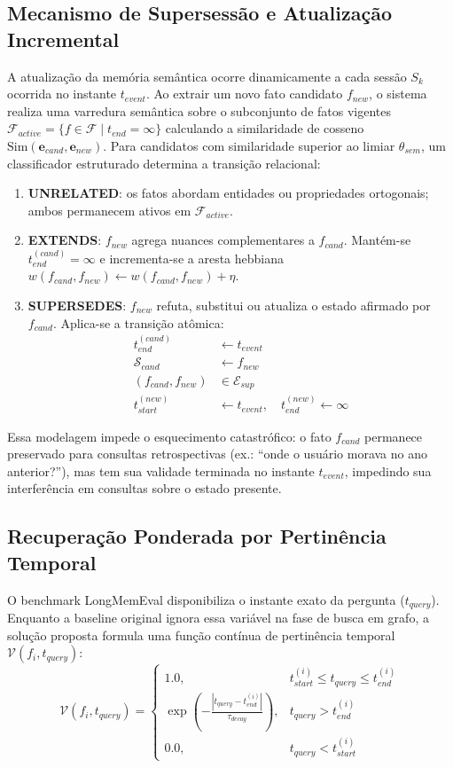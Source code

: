 \documentclass[10pt,conference,twocolumn]{IEEEtran}
\begin{document}
\subsection{Mecanismo de Supersessão e Atualização Incremental}
A atualização da memória semântica ocorre dinamicamente a cada sessão $S_k$ ocorrida no instante $t_{event}$. Ao extrair um novo fato candidato $f_{new}$, o sistema realiza uma varredura semântica sobre o subconjunto de fatos vigentes $\mathcal{F}_{active} = \{f \in \mathcal{F} \mid t_{end} = \infty\}$ calculando a similaridade de cosseno $\text{Sim}(\mathbf{e}_{cand}, \mathbf{e}_{new})$. Para candidatos com similaridade superior ao limiar $\theta_{sem}$, um classificador estruturado determina a transição relacional:
\begin{enumerate}
    \item \textbf{UNRELATED}: os fatos abordam entidades ou propriedades ortogonais; ambos permanecem ativos em $\mathcal{F}_{active}$.
    \item \textbf{EXTENDS}: $f_{new}$ agrega nuances complementares a $f_{cand}$. Mantém-se $t_{end}^{(cand)} = \infty$ e incrementa-se a aresta hebbiana $w(f_{cand}, f_{new}) \leftarrow w(f_{cand}, f_{new}) + \eta$.
    \item \textbf{SUPERSEDES}: $f_{new}$ refuta, substitui ou atualiza o estado afirmado por $f_{cand}$. Aplica-se a transição atômica:
    \begin{align}
        t_{end}^{(cand)} &\leftarrow t_{event} \\
        \mathcal{S}_{cand} &\leftarrow f_{new} \\
        (f_{cand}, f_{new}) &\in \mathcal{E}_{sup} \\
        t_{start}^{(new)} &\leftarrow t_{event}, \quad t_{end}^{(new)} \leftarrow \infty
    \end{align}
\end{enumerate}

Essa modelagem impede o esquecimento catastrófico: o fato $f_{cand}$ permanece preservado para consultas retrospectivas (ex.: ``onde o usuário morava no ano anterior?''), mas tem sua validade terminada no instante $t_{event}$, impedindo sua interferência em consultas sobre o estado presente.

\subsection{Recuperação Ponderada por Pertinência Temporal}
O benchmark LongMemEval disponibiliza o instante exato da pergunta ($t_{query}$). Enquanto a baseline original ignora essa variável na fase de busca em grafo, a solução proposta formula uma função contínua de pertinência temporal $\mathcal{V}(f_i, t_{query})$:
\begin{equation}
\mathcal{V}(f_i, t_{query}) = 
\begin{cases}
1.0, & t_{start}^{(i)} \le t_{query} \le t_{end}^{(i)} \\
\exp\!\left(-\frac{|t_{query} - t_{end}^{(i)}|}{\tau_{decay}}\right), & t_{query} > t_{end}^{(i)} \\
0.0, & t_{query} < t_{start}^{(i)}
\end{cases}
\end{equation}
\end{document}
